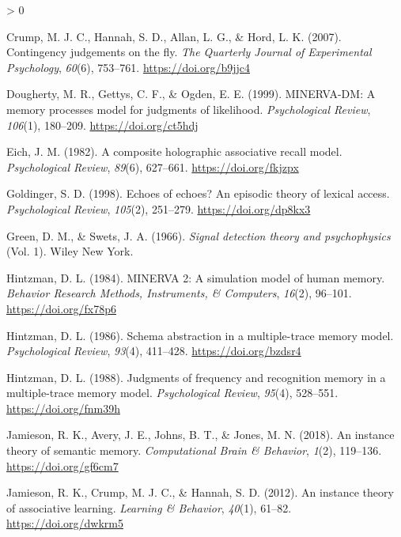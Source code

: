 \documentclass[
  english,
  man,floatsintext]{apa6}
\newlength{\cslhangindent}
\newenvironment{CSLReferences}[2] %
 {%
  \setlength{\parindent}{0pt}
  \ifodd #1 \everypar{\setlength{\hangindent}{\cslhangindent}}\ignorespaces\fi
  \ifnum #2 > 0
  \setlength{\parskip}{#2\baselineskip}
  \fi
 }%
 {}
\begin{document}
\begin{CSLReferences}{1}{0}
\leavevmode\hypertarget{ref-crumpContingencyJudgementsFly2007}{}%
Crump, M. J. C., Hannah, S. D., Allan, L. G., \& Hord, L. K. (2007). Contingency judgements on the fly. \emph{The Quarterly Journal of Experimental Psychology}, \emph{60}(6), 753--761. \url{https://doi.org/b9jjc4}

\leavevmode\hypertarget{ref-doughertyMINERVADMMemoryProcesses1999}{}%
Dougherty, M. R., Gettys, C. F., \& Ogden, E. E. (1999). {MINERVA}-{DM}: {A} memory processes model for judgments of likelihood. \emph{Psychological Review}, \emph{106}(1), 180--209. \url{https://doi.org/ct5hdj}

\leavevmode\hypertarget{ref-eichCompositeHolographicAssociative1982}{}%
Eich, J. M. (1982). A composite holographic associative recall model. \emph{Psychological Review}, \emph{89}(6), 627--661. \url{https://doi.org/fkjzpx}

\leavevmode\hypertarget{ref-goldingerEchoesEchoesEpisodic1998}{}%
Goldinger, S. D. (1998). Echoes of echoes? {An} episodic theory of lexical access. \emph{Psychological Review}, \emph{105}(2), 251--279. \url{https://doi.org/dp8kx3}

\leavevmode\hypertarget{ref-greenSignalDetectionTheory1966}{}%
Green, D. M., \& Swets, J. A. (1966). \emph{Signal detection theory and psychophysics} (Vol. 1). {Wiley New York}.

\leavevmode\hypertarget{ref-hintzmanMINERVASimulationModel1984}{}%
Hintzman, D. L. (1984). {MINERVA} 2: {A} simulation model of human memory. \emph{Behavior Research Methods, Instruments, \& Computers}, \emph{16}(2), 96--101. \url{https://doi.org/fx78p6}

\leavevmode\hypertarget{ref-hintzmanSchemaAbstractionMultipletrace1986}{}%
Hintzman, D. L. (1986). Schema abstraction in a multiple-trace memory model. \emph{Psychological Review}, \emph{93}(4), 411--428. \url{https://doi.org/bzdsr4}

\leavevmode\hypertarget{ref-hintzmanJudgmentsFrequencyRecognition1988}{}%
Hintzman, D. L. (1988). Judgments of frequency and recognition memory in a multiple-trace memory model. \emph{Psychological Review}, \emph{95}(4), 528--551. \url{https://doi.org/fnm39h}

\leavevmode\hypertarget{ref-jamiesonInstanceTheorySemantic2018}{}%
Jamieson, R. K., Avery, J. E., Johns, B. T., \& Jones, M. N. (2018). An instance theory of semantic memory. \emph{Computational Brain \& Behavior}, \emph{1}(2), 119--136. \url{https://doi.org/gf6cm7}

\leavevmode\hypertarget{ref-jamiesonInstanceTheoryAssociative2012}{}%
Jamieson, R. K., Crump, M. J. C., \& Hannah, S. D. (2012). An instance theory of associative learning. \emph{Learning \& Behavior}, \emph{40}(1), 61--82. \url{https://doi.org/dwkrm5}


\end{CSLReferences}
\end{document}
